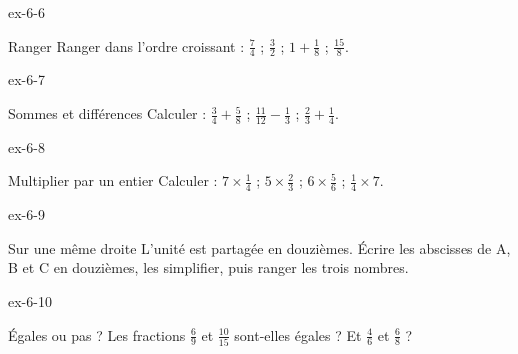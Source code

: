 \begin{blocLivre}{ex-6-6}\begin{exercice}[2]{Ranger}
Ranger dans l’ordre croissant : $\frac74$ ; $\frac32$ ; $1+\frac18$ ; $\frac{15}8$.
\end{exercice}\end{blocLivre}
\begin{blocLivre}{ex-6-7}\begin{exercice}[2]{Sommes et différences}
Calculer : $\frac34+\frac58$ ; $\frac{11}{12}-\frac13$ ; $\frac23+\frac14$.
\end{exercice}\end{blocLivre}
\begin{blocLivre}{ex-6-8}\begin{exercice}[2]{Multiplier par un entier}
Calculer : $7\times\frac14$ ; $5\times\frac23$ ; $6\times\frac56$ ; $\frac14\times7$.
\end{exercice}\end{blocLivre}
\begin{blocLivre}{ex-6-9}\begin{exercice}[2]{Sur une même droite}
L’unité est partagée en douzièmes. Écrire les abscisses de A, B et C en douzièmes, les simplifier, puis ranger les trois nombres.
\label{fig-ex-6-9}
\end{exercice}\end{blocLivre}
\begin{blocLivre}{ex-6-10}\begin{exercice}[2]{Égales ou pas ?}
Les fractions $\frac69$ et $\frac{10}{15}$ sont-elles égales ? Et $\frac46$ et $\frac68$ ?
\end{exercice}\end{blocLivre}

